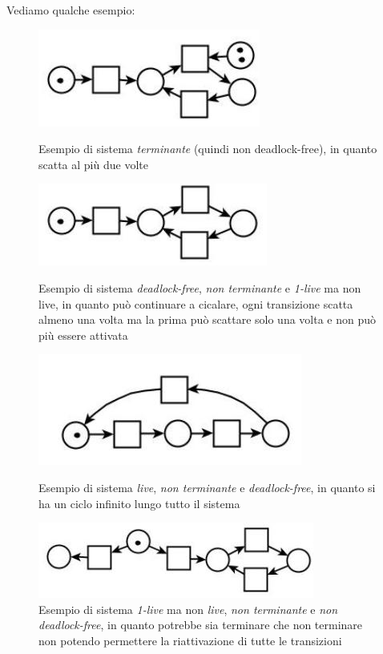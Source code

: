 \documentclass[a4paper,12pt, oneside]{book}
\begin{document}
\begin{esempio}
  Vediamo qualche esempio:
  \begin{figure}[H]
    \centering
    \includegraphics[scale = 0.55]{img/ptc6.jpg}
    \caption{Esempio di sistema \emph{terminante} (quindi non deadlock-free), in
      quanto scatta al più due volte}
    \includegraphics[scale = 0.55]{img/ptc7.jpg}
    \caption{Esempio di sistema \emph{deadlock-free}, \emph{non terminante} e
      \emph{1-live} ma non live, in quanto può continuare a cicalare, ogni
      transizione scatta almeno una volta ma la prima può scattare solo una
      volta e non può più essere attivata} 
    \includegraphics[scale = 0.55]{img/ptc8.jpg}
    \caption{Esempio di sistema \textit{live}, \emph{non terminante} e
      \emph{deadlock-free}, in quanto si ha un ciclo infinito lungo tutto il
      sistema} 
    \includegraphics[scale = 0.55]{img/ptc9.jpg}
    \caption{Esempio di sistema \emph{1-live} ma non \emph{live}, \emph{non
        terminante} e \emph{non deadlock-free}, in quanto potrebbe sia terminare
      che non terminare non potendo permettere la riattivazione di tutte le
      transizioni}  
  \end{figure}
\end{esempio}
\newpage
\end{document}

